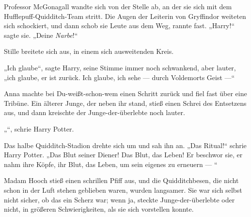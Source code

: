 Professor McGonagall wandte sich von der Stelle ab, an der sie sich mit dem Hufflepuff-Quidditch-Team stritt. Die Augen der Leiterin von Gryffindor weiteten sich schockiert, und dann schob sie Leute aus dem Weg, rannte fast.
„Harry!“ sagte sie.
„Deine \emph{Narbe}!“

Stille breitete sich aus, in einem sich ausweitenden Kreis.

„Ich glaube“, sagte Harry, seine Stimme immer noch schwankend, aber lauter, „ich glaube, er ist zurück. Ich glaube, ich sehe — durch Voldemorts Geist —“

Anna machte bei Du-weißt-schon-wem einen Schritt zurück und fiel fast über eine Tribüne. Ein älterer Junge, der neben ihr stand, stieß einen Schrei des Entsetzens aus, und dann kreischte der Junge-der-überlebte noch lauter.

„“, schrie Harry Potter.

Das halbe Quidditch-Stadion drehte sich um und sah ihn an.
„Das Ritual!“ schrie Harry Potter.
„Das Blut seiner Diener! Das Blut, das Leben! Er beschwor sie, er nahm ihre Köpfe, ihr Blut, das Leben, um sein eigenes zu erneuern — “

Madam Hooch stieß einen schrillen Pfiff aus, und die Quidditchbesen, die nicht schon in der Luft stehen geblieben waren, wurden langsamer. Sie war sich selbst nicht sicher, ob das ein Scherz war; wenn ja, steckte Junge-der-überlebte oder nicht, in größeren Schwierigkeiten, als sie sich vorstellen konnte.

